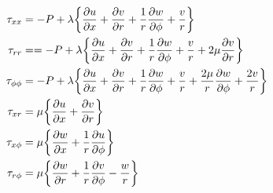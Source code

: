 \begin{equation}
  \begin{aligned}
    \tau_{xx} 
    &=  -P + \lambda\bigg\{
      \pdv{u}{x} + \pdv{v}{r} + \frac{1}{r}\pdv{w}{\phi} + \frac{v}{r}
    \bigg\} \\
    \tau_{rr} 
    &= = -P +  \lambda\bigg\{
      \pdv{u}{x} + \pdv{v}{r} + \frac{1}{r}\pdv{w}{\phi} + \frac{v}{r}
      + 2\mu\pdv{v}{r} 
    \bigg\} \\
    \tau_{\phi\phi} 
    &= - P +  \lambda\bigg\{
      \pdv{u}{x} + \pdv{v}{r} + \frac{1}{r}\pdv{w}{\phi} + \frac{v}{r}
      + \frac{2\mu}{r}\pdv{w}{\phi} + \frac{2 v}{r} \bigg\} \\
    \tau_{xr}
    &= \mu\bigg\{\pdv{u}{x} + \pdv{v}{r}\bigg\} \\
    \tau_{x\phi} 
    &= \mu\bigg\{\pdv{w}{x} + \frac{1}{r}\pdv{u}{\phi}\bigg\} \\
    \tau_{r\phi}
    &= \mu\bigg\{\pdv{w}{r} + \frac{1}{r}\pdv{v}{\phi} - \frac{w}{r}
    \bigg\}
  \end{aligned}
\end{equation}


